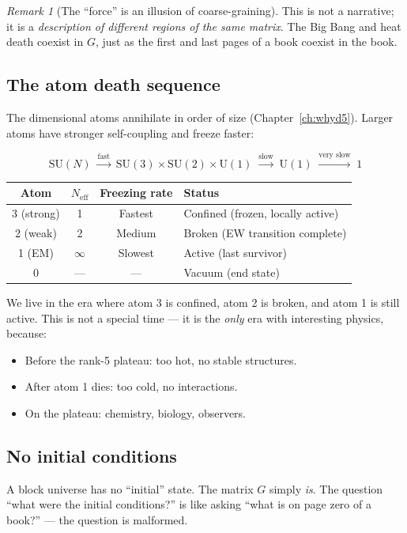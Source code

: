 \documentclass[12pt]{article}
\theoremstyle{remark}
\newtheorem{remark}[theorem]{Remark}
\theoremstyle{definition}
\begin{document}
\begin{remark}[The ``force'' is an illusion of coarse-graining]
This is not a narrative; it is a \emph{description of different regions of the same matrix}. The Big Bang and heat death coexist in $G$, just as the first and last pages of a book coexist in the book.

\subsection{The atom death sequence}

The dimensional atoms annihilate in order of size (Chapter~\ref{ch:whyd5}). Larger atoms have stronger self-coupling and freeze faster:

\begin{equation}
\text{SU}(N) \;\xrightarrow{\text{fast}}\; \text{SU}(3) \times \text{SU}(2) \times \text{U}(1) \;\xrightarrow{\text{slow}}\; \text{U}(1) \;\xrightarrow{\text{very slow}}\; 1
\end{equation}

\begin{center}
\begin{tabular}{cccl}
\hline
Atom & $N_\text{eff}$ & Freezing rate & Status \\
\hline
3 (strong) & 1 & Fastest & Confined (frozen, locally active) \\
2 (weak) & 2 & Medium & Broken (EW transition complete) \\
1 (EM) & $\infty$ & Slowest & Active (last survivor) \\
0 & --- & --- & Vacuum (end state) \\
\hline
\end{tabular}
\end{center}

We live in the era where atom 3 is confined, atom 2 is broken, and atom 1 is still active. This is not a special time --- it is the \emph{only} era with interesting physics, because:
\begin{itemize}
\item Before the rank-5 plateau: too hot, no stable structures.
\item After atom 1 dies: too cold, no interactions.
\item On the plateau: chemistry, biology, observers.
\end{itemize}

\subsection{No initial conditions}

A block universe has no ``initial'' state. The matrix $G$ simply \emph{is}. The question ``what were the initial conditions?'' is like asking ``what is on page zero of a book?'' --- the question is malformed.


\end{remark}
\end{document}
